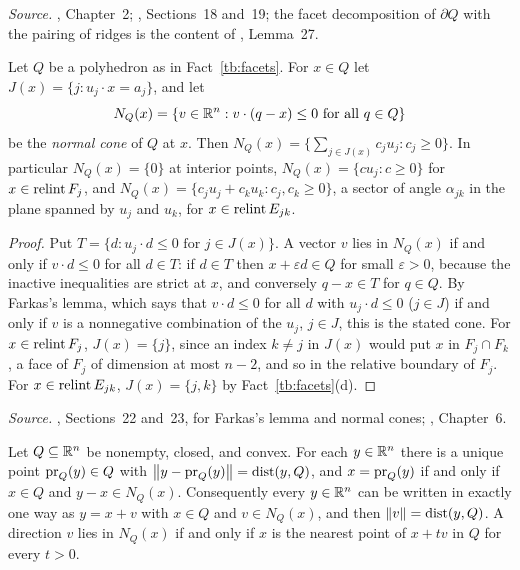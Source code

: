\emph{Source.} , Chapter~2; , Sections~18 and~19;
the facet decomposition of \(\partial Q\) with the pairing of ridges is
the content of , Lemma~27.

\begin{fact}\label{tb:normalcone}
Let \(Q\) be a polyhedron as in Fact~\ref{tb:facets}. For \(x\in Q\) let
\(J(x)=\{j:u_j\cdot x=a_j\}\), and let
\[
 N_Q(x)=\{v\in\mathbb R^n:v\cdot(q-x)\le0\text{ for all }q\in Q\}
\]
be the \emph{normal cone} of \(Q\) at \(x\). Then
\(N_Q(x)=\{\sum_{j\in J(x)}c_ju_j:c_j\ge0\}\). In particular
\(N_Q(x)=\{0\}\) at interior points, \(N_Q(x)=\{cu_j:c\ge0\}\) for
\(x\in\operatorname{relint} F_j\), and \(N_Q(x)=\{c_ju_j+c_ku_k:c_j,c_k\ge0\}\), a sector of
angle \(\alpha_{jk}\) in the plane spanned by \(u_j\) and \(u_k\), for
\(x\in\operatorname{relint} E_{jk}\).
\end{fact}

\begin{proof}
Put \(T=\{d:u_j\cdot d\le0\text{ for }j\in J(x)\}\). A vector \(v\) lies in
\(N_Q(x)\) if and only if \(v\cdot d\le0\) for all \(d\in T\): if \(d\in T\)
then \(x+\varepsilon d\in Q\) for small \(\varepsilon>0\), because the
inactive inequalities are strict at \(x\), and conversely \(q-x\in T\) for
\(q\in Q\). By Farkas's lemma, which says that \(v\cdot d\le0\) for all
\(d\) with \(u_j\cdot d\le0\) (\(j\in J\)) if and only if \(v\) is a
nonnegative combination of the \(u_j\), \(j\in J\), this is the stated
cone. For \(x\in\operatorname{relint} F_j\), \(J(x)=\{j\}\), since an index \(k\ne j\) in
\(J(x)\) would put \(x\) in \(F_j\cap F_k\), a face of \(F_j\) of dimension
at most \(n-2\), and so in the relative boundary of \(F_j\). For
\(x\in\operatorname{relint} E_{jk}\), \(J(x)=\{j,k\}\) by Fact~\ref{tb:facets}(d).
\end{proof}

\emph{Source.} , Sections~22 and~23, for Farkas's lemma and normal
cones; , Chapter~6.

\begin{fact}\label{tb:projection}
Let \(Q\subseteq\mathbb R^n\) be nonempty, closed, and convex. For each
\(y\in\mathbb R^n\) there is a unique point \(\operatorname{pr}_Q(y)\in Q\) with
\(\left\lVert y-\operatorname{pr}_Q(y)\right\rVert=\operatorname{dist}(y,Q)\), and \(x=\operatorname{pr}_Q(y)\) if and only if
\(x\in Q\) and \(y-x\in N_Q(x)\). Consequently every \(y\in\mathbb R^n\) can be
written in exactly one way as \(y=x+v\) with \(x\in Q\) and \(v\in N_Q(x)\),
and then \(\left\lVert v\right\rVert=\operatorname{dist}(y,Q)\). A direction \(v\) lies in \(N_Q(x)\) if and
only if \(x\) is the nearest point of \(x+tv\) in \(Q\) for every \(t>0\).
\end{fact}

